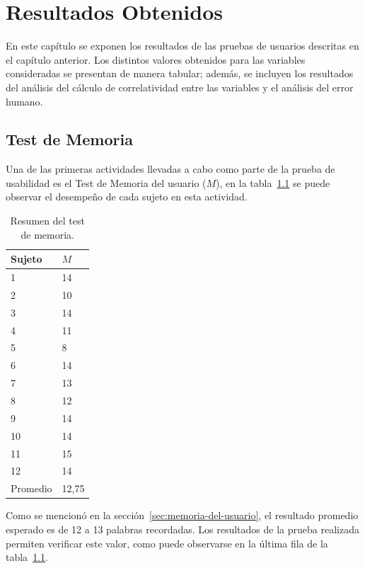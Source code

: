 \chapter{Resultados Obtenidos}
\label{sec:resultados}

En este cap\'itulo se exponen los resultados de las pruebas de usuarios descritas en el cap\'itulo
anterior. Los distintos valores obtenidos para las variables consideradas se presentan de manera
tabular; adem\'as, se incluyen los resultados del an\'alisis del c\'alculo de correlatividad entre las
variables y el an\'alisis del error humano.


\section{Test de Memoria}

Una de las primeras actividades llevadas a cabo como parte de la prueba de usabilidad es 
el Test de Memoria del usuario ($M$), en la tabla~\ref{sec:tabla-memoria} se puede observar
el desempe\~no de cada sujeto en esta actividad.

\begin{table}[H]
\centering
\footnotesize
\begin{tabular}{|p{1.6cm}|p{1.6cm}|}
\hline
    Sujeto & $M$ \\
    \hline 
    1 & 14 \\
    2 & 10 \\
    3 & 14 \\
    4 & 11 \\
    5 & 8 \\
    6 & 14 \\
    7 & 13 \\
    8 & 12 \\
    9 & 14 \\
    10 & 14 \\
    11 & 15 \\
    12 & 14 \\
\hline
Promedio &  12,75 \\
\hline
\end{tabular}
\caption{Resumen del test de memoria.}
\label{sec:tabla-memoria}
\end{table}

Como se mencion\'o en la secci\'on~\ref{sec:memoria-del-usuario}, el resultado promedio esperado es
de 12 a 13 palabras recordadas.
Los resultados de la prueba realizada permiten verificar este valor, como puede observarse en la 
\'ultima fila de la tabla~\ref{sec:tabla-memoria}.

